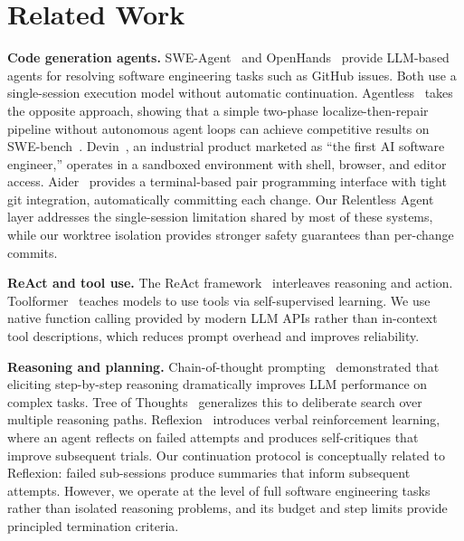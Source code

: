 \documentclass{article}
\begin{document}
\section{Related Work}
\label{sec:related}

\textbf{Code generation agents.}
SWE-Agent~\citep{yang2024sweagent} and
OpenHands~\citep{wang2024openhands} provide LLM-based agents for
resolving software engineering tasks such as GitHub issues.  Both use
a single-session execution model without automatic continuation.
Agentless~\citep{xia2024agentless} takes the opposite approach,
showing that a simple two-phase localize-then-repair pipeline without
autonomous agent loops can achieve competitive results on
SWE-bench~\citep{jimenez2024swebench}.  Devin~\citep{devin2024}, an
industrial product marketed as ``the first AI software engineer,''
operates in a sandboxed environment with shell, browser, and editor
access.  Aider~\citep{aider2023} provides a terminal-based pair
programming interface with tight git integration, automatically
committing each change.  Our Relentless Agent layer addresses the
single-session limitation shared by most of these systems, while our
worktree isolation provides stronger safety guarantees than per-change
commits.

\textbf{ReAct and tool use.}
The ReAct framework~\citep{yao2023react} interleaves reasoning and
action.  Toolformer~\citep{schick2023toolformer} teaches models to use
tools via self-supervised learning.  We use native function calling
provided by modern LLM APIs rather than in-context tool
descriptions, which reduces prompt overhead and improves reliability.

\textbf{Reasoning and planning.}
Chain-of-thought prompting~\citep{wei2022chain} demonstrated that
eliciting step-by-step reasoning dramatically improves LLM performance
on complex tasks.  Tree of Thoughts~\citep{yao2024tree} generalizes
this to deliberate search over multiple reasoning paths.
Reflexion~\citep{shinn2023reflexion} introduces verbal reinforcement
learning, where an agent reflects on failed attempts and produces
self-critiques that improve subsequent trials.  Our continuation
protocol is conceptually related to Reflexion: failed sub-sessions
produce summaries that inform subsequent attempts.  However, we
operate at the level of full software
engineering tasks rather than isolated reasoning problems, and its
budget and step limits provide principled termination criteria.
\end{document}
